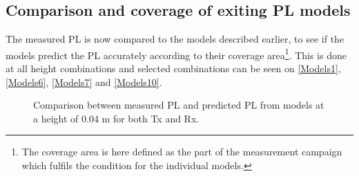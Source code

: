 

%
%
%
%
%


\subsection{Comparison and coverage of exiting PL models}

The measured PL is now compared to the models described earlier, to see if the models predict the PL accurately according to their coverage area\footnote{The coverage area is here defined as the part of the measurement campaign which fulfils the condition for the individual models.}. This is done at all height combinations and selected combinations can be seen on \autoref{Models1}, \autoref{Models6}, \autoref{Models7} and \autoref{Models10}.

\begin{figure}[H]
\centering

\caption{Comparison between measured PL and predicted PL from models at a height of 0.04 m for both Tx and Rx.}
\label{Models1}
\end{figure}



